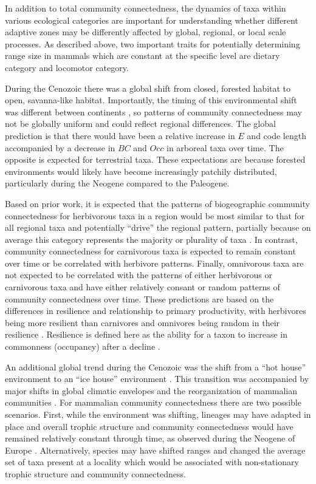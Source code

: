 \documentclass[12pt,letterpaper]{article}
\begin{document}
In addition to total community connectedness, the dynamics of taxa within various ecological categories are important for understanding whether different adaptive zones may be differently affected by global, regional, or local scale processes. As described above, two important traits for potentially determining range size in mammals which are constant at the specific level are dietary category and locomotor category. 

During the Cenozoic there was a global shift from closed, forested habitat to open, savanna-like habitat. Importantly, the timing of this environmental shift was different between continents \citep{Stromberg2005,Stromberg2013}, so patterns of community connectedness may not be globally uniform and could reflect regional differences. The global prediction is that there would have been a relative increase in \(E\) and code length accompanied by a decrease in \(BC\) and \(Occ\) in arboreal taxa over time. The opposite is expected for terrestrial taxa. These expectations are because forested environments would likely have become increasingly patchily distributed, particularly during the Neogene compared to the Paleogene.

Based on prior work, it is expected that the patterns of biogeographic community connectedness for herbivorous taxa in a region would be most similar to that for all regional taxa and potentially ``drive'' the regional pattern, partially because on average this category represents the majority or plurality of taxa \citep{Jernvall2002}. In contrast, community connectedness for carnivorous taxa is expected to remain constant over time or be correlated with herbivore patterns. Finally, omnivorous taxa are not expected to be correlated with the patterns of either herbivorous or carnivorous taxa and have either relatively consant or random patterns of community connectedness over time.  These predictions are based on the differences in resilience and relationship to primary productivity, with herbivores being more resilient than carnivores and omnivores being random in their resilience \citep{Jernvall2004}. Resilience is defined here as the ability for a taxon to increase in commonness (occupancy) after a decline \citep{Jernvall2004}.

An additional global trend during the Cenozoic was the shift from a ``hot house'' environment to an ``ice house'' environment \citep{Zachos2008,Zachos2001}. This transition was accompanied by major shifts in global climatic envelopes and the reorganization of mammalian communities \citep{Janis1993a,Fortelius2002,Blois2009,Alroy2000g,Figueirido2012}. For mammalian community connectedness there are two possible scenarios. First, while the environment was shifting, lineages may have adapted in place and overall trophic structure and community connectedness would have remained relatively constant through time, as observed during the Neogene of Europe \citep{Jernvall2004}. Alternatively, species may have shifted ranges and changed the average set of taxa present at a locality which would be associated with non-stationary trophic structure and community connectedness.
\end{document}
